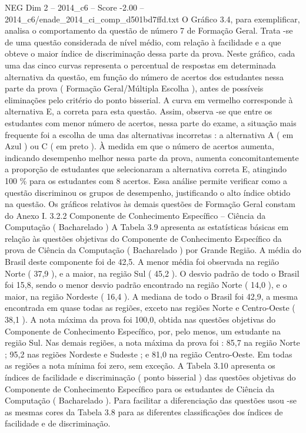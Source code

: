 \begin{textsample}{NEG Dim 2 – 2014\_c6 – Score -2.00 – 2014\_c6/enade\_2014\_ci\_comp\_d501bd7ffd.txt}
O Gráfico 3.4, para exemplificar, analisa o comportamento da questão de número 7 de Formação Geral.
Trata -se de uma questão considerada de nível médio, com relação à facilidade e a que obteve o maior índice de discriminação dessa parte da prova.
Neste gráfico, cada uma das cinco curvas representa o percentual de respostas em determinada alternativa da questão, em função do número de acertos dos estudantes nessa parte da prova ( Formação Geral/Múltipla Escolha ), antes de possíveis eliminações pelo critério do ponto bisserial.
A curva em vermelho corresponde à alternativa E, a correta para esta questão.
Assim, observa -se que entre os estudantes com menor número de acertos, nessa parte do exame, a situação mais frequente foi a escolha de uma das alternativas incorretas : a alternativa A ( em Azul ) ou C ( em preto ).
À medida em que o número de acertos aumenta, indicando desempenho melhor nessa parte da prova, aumenta concomitantemente a proporção de estudantes que selecionaram a alternativa correta E, atingindo 100 \% para os estudantes com 8 acertos.
Essa análise permite verificar como a questão discriminou os grupos de desempenho, justificando o alto índice obtido na questão.
Os gráficos relativos às demais questões de Formação Geral constam do Anexo I. 3.2.2 Componente de Conhecimento Específico – Ciência da Computação ( Bacharelado ) A Tabela 3.9 apresenta as estatísticas básicas em relação às questões objetivas do Componente de Conhecimento Específico da prova de Ciência da Computação ( Bacharelado ) por Grande Região.
A média do Brasil deste componente foi de 42,5.
A menor média foi observada na região Norte ( 37,9 ), e a maior, na região Sul ( 45,2 ).
O desvio padrão de todo o Brasil foi 15,8, sendo o menor desvio padrão encontrado na região Norte ( 14,0 ), e o maior, na região Nordeste ( 16,4 ).
A mediana de todo o Brasil foi 42,9, a mesma encontrada em quase todas as regiões, exceto nas regiões Norte e Centro-Oeste ( 38,1 ).
A nota máxima da prova foi 100,0, obtida nas questões objetivas do Componente de Conhecimento Específico, por, pelo menos, um estudante na região Sul.
Nas demais regiões, a nota máxima da prova foi : 85,7 na região Norte ; 95,2 nas regiões Nordeste e Sudeste ; e 81,0 na região Centro-Oeste.
Em todas as regiões a nota mínima foi zero, sem exceção.
A Tabela 3.10 apresenta os índices de facilidade e discriminação ( ponto bisserial ) das questões objetivas do Componente de Conhecimento Específico para os estudantes de Ciência da Computação ( Bacharelado ).
Para facilitar a diferenciação das questões usou -se as mesmas cores da Tabela 3.8 para as diferentes classificações dos índices de facilidade e de discriminação.

\end{textsample}
